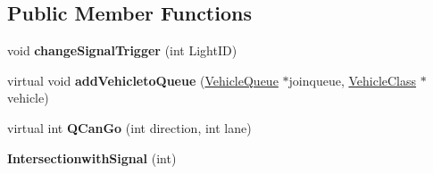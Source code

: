 \subsection*{Public Member Functions}
\begin{DoxyCompactItemize}
\item 
\hypertarget{class_intersectionwith_signal_a7fa2f6aa47aa7624c483523a920d92a4}{void {\bfseries change\-Signal\-Trigger} (int Light\-I\-D)}\label{class_intersectionwith_signal_a7fa2f6aa47aa7624c483523a920d92a4}

\item 
\hypertarget{class_intersectionwith_signal_aa918c9a3033c16fac6bfa0e996677670}{virtual void {\bfseries add\-Vehicleto\-Queue} (\hyperlink{class_vehicle_queue}{Vehicle\-Queue} $\ast$joinqueue, \hyperlink{class_vehicle_class}{Vehicle\-Class} $\ast$vehicle)}\label{class_intersectionwith_signal_aa918c9a3033c16fac6bfa0e996677670}

\item 
\hypertarget{class_intersectionwith_signal_a3b2a6f1e258fcd15828ffb7e9e9881b3}{virtual int {\bfseries Q\-Can\-Go} (int direction, int lane)}\label{class_intersectionwith_signal_a3b2a6f1e258fcd15828ffb7e9e9881b3}

\item 
\hypertarget{class_intersectionwith_signal_ab5eccdd602e1d9c0f6d39b5be79173d1}{{\bfseries Intersectionwith\-Signal} (int)}\label{class_intersectionwith_signal_ab5eccdd602e1d9c0f6d39b5be79173d1}

\end{DoxyCompactItemize}

